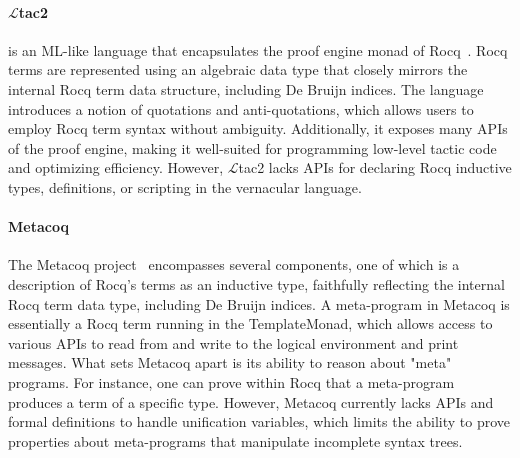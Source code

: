 \documentclass[sigplan,natbib=false]{acmart}
\begin{document}
\paragraph{
$\mathcal{L}$tac2} is an ML-like language that encapsulates the proof engine
monad of Rocq~\cite{10.1145/1090189.1086390}. Rocq terms are represented using
an algebraic data type that closely mirrors the internal Rocq term data
structure, including De Bruijn indices. The language introduces a notion of
quotations and anti-quotations, which allows users to employ Rocq term syntax
without ambiguity. Additionally, it exposes many APIs of the proof engine,
making it well-suited for programming low-level tactic code and optimizing
efficiency. However, $\mathcal{L}$tac2 lacks APIs for declaring Rocq inductive
types, definitions, or scripting in the vernacular language.

\paragraph{Metacoq}
The Metacoq project~\cite{sozeau:hal-02167423} encompasses several components,
one of which is a description of Rocq's terms as an inductive type, faithfully
reflecting the internal Rocq term data type, including De Bruijn indices. A
meta-program in Metacoq is essentially a Rocq term running in the
TemplateMonad, which allows access to various APIs to read from and write to
the logical environment and print messages. What sets Metacoq apart is its
ability to reason about "meta" programs. For instance, one can prove within
Rocq that a meta-program produces a term of a specific type. However, Metacoq
currently lacks APIs and formal definitions to handle unification variables,
which limits the ability to prove properties about meta-programs that
manipulate incomplete syntax trees.
\end{document}
